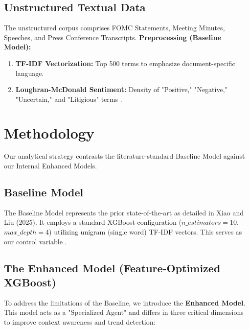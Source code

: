 \documentclass[11pt, a4paper]{article}
\begin{document}
\subsection{Unstructured Textual Data}
The unstructured corpus comprises FOMC Statements, Meeting Minutes, Speeches, and Press Conference Transcripts.
\textbf{Preprocessing (Baseline Model):}
\begin{enumerate}
    \item \textbf{TF-IDF Vectorization:} Top 500 terms to emphasize document-specific language.
    \item \textbf{Loughran-McDonald Sentiment:} Density of "Positive," "Negative," "Uncertain," and "Litigious" terms \cite{ref4}.
\end{enumerate}

\section{Methodology}
Our analytical strategy contrasts the literature-standard Baseline Model against our Internal Enhanced Models.

\subsection{Baseline Model}
The Baseline Model represents the prior state-of-the-art as detailed in Xiao and Liu (2025). It employs a standard XGBoost configuration ($n\_estimators=10$, $max\_depth=4$) utilizing unigram (single word) TF-IDF vectors. This serves as our control variable \cite{ref1}.

\subsection{The Enhanced Model (Feature-Optimized XGBoost)}
To address the limitations of the Baseline, we introduce the \textbf{Enhanced Model}. This model acts as a "Specialized Agent" and differs in three critical dimensions to improve context awareness and trend detection:
\end{document}

